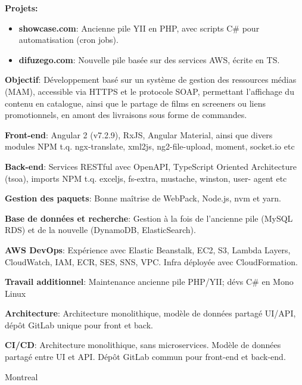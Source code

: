 \documentclass[
  a4paper,
   maincolor=cvblue,
   sectioncolor=cvblue,
   sidebarwidth=0.323\paperwidth,
]{fortysecondscv}
\begin{document}
\begin{cvtableNew}
{        \vspace{0.1pt} %
        \textbf{Projets:}
        \begin{itemize}[itemsep=1mm, topsep=5pt, leftmargin=8pt]
          \item \textbf{showcase.com}: Ancienne pile YII en PHP, avec scripts C\# pour automatisation (cron jobs).
          \item \textbf{difuzego.com}: Nouvelle pile basée sur des services AWS, écrite en TS.
        \end{itemize}

        \vspace{4pt} %
        \textbf{Objectif}: Développement basé sur un système de gestion des ressources médias (MAM), accessible via HTTPS et le protocole SOAP, permettant l’affichage du contenu en catalogue, ainsi que le partage de films en screeners ou liens promotionnels, en amont des livraisons sous forme de commandes.\vspace{5pt}

        \textbf{Front-end}:  Angular 2 (v7.2.9), RxJS, Angular Material, ainsi que divers modules NPM t.q. ngx-translate, xml2js, ng2-file-upload, moment, socket.io etc\vspace{5pt}

        \textbf{Back-end}: Services RESTful avec OpenAPI, TypeScript Oriented Architecture (tsoa), imports NPM t.q. exceljs, fs-extra, mustache, winston, user-
        agent etc\vspace{5pt}

        \textbf{Gestion des paquets}: Bonne maîtrise de WebPack, Node.js, nvm et yarn.\vspace{5pt}

        \textbf{Base de données et recherche}: Gestion à la fois de l’ancienne pile (MySQL RDS) et de la nouvelle (DynamoDB, ElasticSearch).\vspace{5pt}

        \textbf{AWS DevOps}: Expérience avec Elastic Beanstalk, EC2, S3, Lambda Layers, CloudWatch, IAM, ECR, SES, SNS, VPC. Infra déployée avec CloudFormation.\vspace{5pt}

        \textbf{Travail additionnel}: Maintenance ancienne pile PHP/YII; dévs C\# en Mono Linux\vspace{5pt}

        \textbf{Architecture}: Architecture monolithique, modèle de données partagé UI/API, dépôt GitLab unique pour front et back.\vspace{5pt}

        \textbf{CI/CD}: Architecture monolithique, sans microservices. Modèle de données partagé entre UI et API. Dépôt GitLab commun pour front-end et back-end.
      }
    {Montreal} %
\end{cvtableNew}
\end{document}
